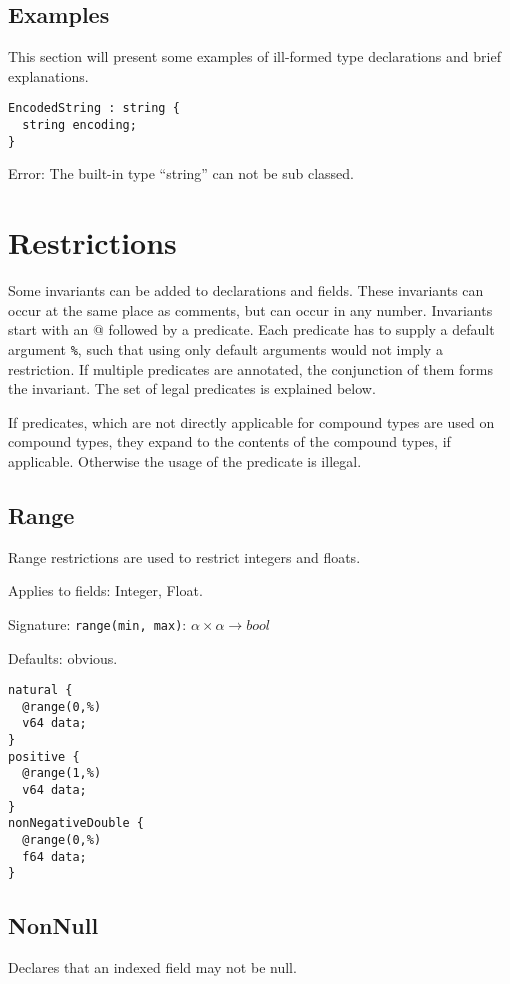 \documentclass[a4paper,10pt]{article}
\begin{document}
\subsection{Examples}

This section will present some examples of ill-formed type declarations and brief explanations.

\begin{lstlisting}[label=stringExample,caption=Legal Super Types,language=skill]
EncodedString : string {
  string encoding;
}
\end{lstlisting}
Error: The built-in type ``string'' can not be sub classed.

\section{Restrictions}
Some invariants can be added to declarations and fields. These invariants can occur at the same place as comments, but can occur in any number. Invariants start with an \textsc{@} followed by a predicate. Each predicate has to supply a default argument \texttt{\%}, such that using only default arguments would not imply a restriction.
If multiple predicates are annotated, the conjunction of them forms the invariant.
The set of legal predicates is explained below.

If predicates, which are not directly applicable for compound types are used on compound types, they expand to the contents of the compound types, if applicable. Otherwise the usage of the predicate is illegal.

\subsection*{Range}
Range restrictions are used to restrict integers and floats.

Applies to fields: Integer, Float.

Signature: \verb/range(min, max)/: $\alpha \times \alpha → bool$

Defaults: obvious.

\begin{lstlisting}[label=rangeExample,caption=Examples,language=skill]
natural {
  @range(0,%)
  v64 data;
}
positive {
  @range(1,%)
  v64 data;
}
nonNegativeDouble {
  @range(0,%)
  f64 data;
}
\end{lstlisting}

\subsection*{NonNull}
Declares that an indexed field may not be null.
\end{document}
